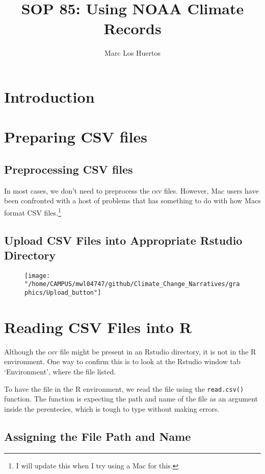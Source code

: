 \documentclass{article}\usepackage[]{graphicx}\usepackage[]{color}
\title{SOP 85: Using NOAA Climate Records}
\author{Marc Los Huertos}
\begin{document}
\maketitle

\section{Introduction}



\section{Preparing CSV files}

\subsection{Preprocessing CSV files}

In most cases, we don't need to preprocess the csv files. However, Mac users have been confronted with a host of problems that has something to do with how Macs format CSV files.\footnote{I will update this when I try using a Mac for this.}

\subsection{Upload CSV Files into Appropriate Rstudio Directory}

\begin{figure}[h]
\texttt{[image: "/home/CAMPUS/mwl04747/github/Climate\_Change\_Narratives/graphics/Upload\_button"]}
\end{figure}


\section{Reading CSV Files into R}

Although the csv file might be present in an Rstudio directory, it is not in the R environment. One way to confirm this is to look at the Rstudio window tab `Environment', where the file listed. 

To have the file in the R environment, we read the file using the \verb!read.csv()! function. The function is expecting the path and name of the file as an argument inside the perentecies, which is tough to type without making errors. 

\subsection{Assigning the File Path and Name}
\end{document}
